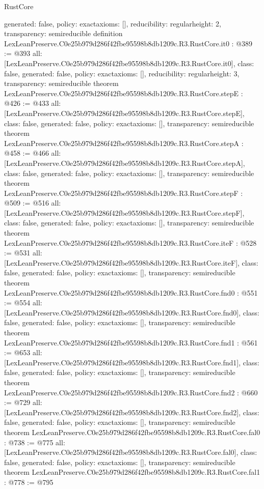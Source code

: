 \begin{lexlean}{RustCore}
\begin{coremodule}
{  generated: false,
  policy: exact{axioms: []},
  reducibility: regular{height: 2},
  transparency: semireducible
}
definition LexLeanPreserve.C0e25b979d286f42fbe95598b8db1209c.R3.RustCore.it0 : @389 := @393 {
  all: [LexLeanPreserve.C0e25b979d286f42fbe95598b8db1209c.R3.RustCore.it0],
  class: false,
  generated: false,
  policy: exact{axioms: []},
  reducibility: regular{height: 3},
  transparency: semireducible
}
theorem LexLeanPreserve.C0e25b979d286f42fbe95598b8db1209c.R3.RustCore.stepE : @426 := @433 {
  all: [LexLeanPreserve.C0e25b979d286f42fbe95598b8db1209c.R3.RustCore.stepE],
  class: false,
  generated: false,
  policy: exact{axioms: []},
  transparency: semireducible
}
theorem LexLeanPreserve.C0e25b979d286f42fbe95598b8db1209c.R3.RustCore.stepA : @458 := @466 {
  all: [LexLeanPreserve.C0e25b979d286f42fbe95598b8db1209c.R3.RustCore.stepA],
  class: false,
  generated: false,
  policy: exact{axioms: []},
  transparency: semireducible
}
theorem LexLeanPreserve.C0e25b979d286f42fbe95598b8db1209c.R3.RustCore.stepF : @509 := @516 {
  all: [LexLeanPreserve.C0e25b979d286f42fbe95598b8db1209c.R3.RustCore.stepF],
  class: false,
  generated: false,
  policy: exact{axioms: []},
  transparency: semireducible
}
theorem LexLeanPreserve.C0e25b979d286f42fbe95598b8db1209c.R3.RustCore.iteF : @528 := @531 {
  all: [LexLeanPreserve.C0e25b979d286f42fbe95598b8db1209c.R3.RustCore.iteF],
  class: false,
  generated: false,
  policy: exact{axioms: []},
  transparency: semireducible
}
theorem LexLeanPreserve.C0e25b979d286f42fbe95598b8db1209c.R3.RustCore.fnd0 : @551 := @554 {
  all: [LexLeanPreserve.C0e25b979d286f42fbe95598b8db1209c.R3.RustCore.fnd0],
  class: false,
  generated: false,
  policy: exact{axioms: []},
  transparency: semireducible
}
theorem LexLeanPreserve.C0e25b979d286f42fbe95598b8db1209c.R3.RustCore.fnd1 : @561 := @653 {
  all: [LexLeanPreserve.C0e25b979d286f42fbe95598b8db1209c.R3.RustCore.fnd1],
  class: false,
  generated: false,
  policy: exact{axioms: []},
  transparency: semireducible
}
theorem LexLeanPreserve.C0e25b979d286f42fbe95598b8db1209c.R3.RustCore.fnd2 : @660 := @729 {
  all: [LexLeanPreserve.C0e25b979d286f42fbe95598b8db1209c.R3.RustCore.fnd2],
  class: false,
  generated: false,
  policy: exact{axioms: []},
  transparency: semireducible
}
theorem LexLeanPreserve.C0e25b979d286f42fbe95598b8db1209c.R3.RustCore.fal0 : @738 := @775 {
  all: [LexLeanPreserve.C0e25b979d286f42fbe95598b8db1209c.R3.RustCore.fal0],
  class: false,
  generated: false,
  policy: exact{axioms: []},
  transparency: semireducible
}
theorem LexLeanPreserve.C0e25b979d286f42fbe95598b8db1209c.R3.RustCore.fal1 : @778 := @795 {
}
\end{coremodule}
\end{lexlean}
